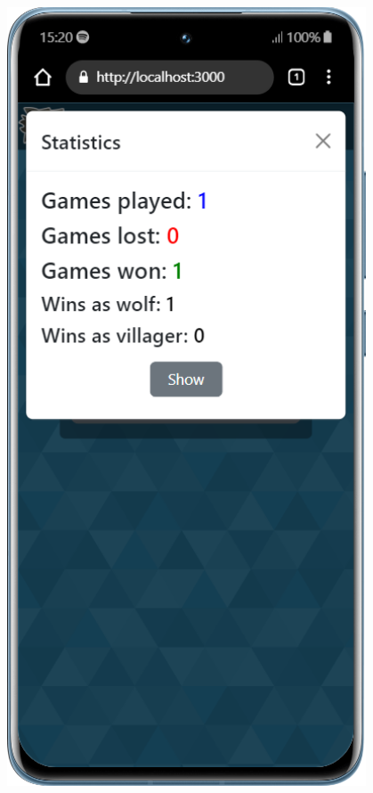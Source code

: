 \begin{figure}[H]
    \centering
    \begin{minipage}{0.25\textwidth}
        \centering
        \includegraphics[width=0.95\textwidth]{img/screen/mobile/stats_mobile.png}

\end{minipage}
\end{figure}
